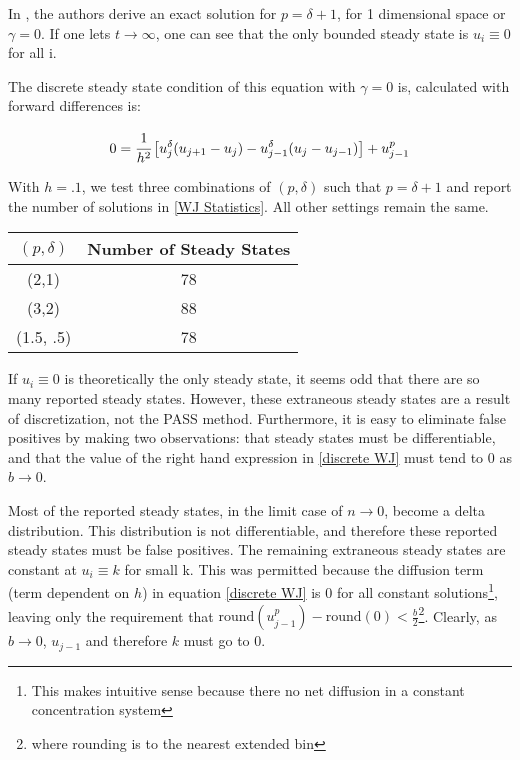 \documentclass[11pt]{article}
\begin{document}
In \citep{WJ}, the authors derive an exact solution for $p = \delta + 1$, for 1 dimensional space or $\gamma = 0$. If one lets $t \rightarrow \infty$, one can see that the only bounded steady state is $u_i \equiv 0$ for all i.

The discrete steady state condition of this equation with $\gamma = 0$ is, calculated with forward differences is:

\begin{equation}
  \label{discrete WJ}
  0 = \cfrac{1}{h^2} \left[ u_{j}^\delta (u_{j+1} - u_{j}) - u_{j-1}^\delta (u_{j} - u_{j-1}) \right] + u_{j-1}^p
\end{equation}

With $h = .1$, we test three combinations of $(p, \delta)$ such that $p = \delta + 1$ and report the number of solutions in \cref{WJ Statistics}. All other settings remain the same.

\begin{table*}
\begin{center}
\label{WJ Statistics}
\begin{tabular}{ | c | c | }
\hline
$(p, \delta)$ & Number of Steady States \\
\hline
(2,1) & 78 \\
\hline
(3,2) & 88 \\ 
\hline
(1.5, .5) & 78 \\
\hline
\end{tabular}
\setcounter{table}{1}
\caption{$(p, \delta)$ vs. Number of numerical steady states given $h = .1$}
\end{center}
\end{table*}

If $u_i \equiv 0$ is theoretically the only steady state, it seems odd that there are so many reported steady states. However, these extraneous steady states are a result of discretization, not the PASS method. Furthermore, it is easy to eliminate false positives by making two observations: that steady states must be differentiable, and that the value of the right hand expression in \cref{discrete WJ} must tend to 0 as $b \rightarrow 0$. 

Most of the reported steady states, in the limit case of $n \rightarrow 0$, become a delta distribution. This distribution is not differentiable, and therefore these reported steady states must be false positives. The remaining extraneous steady states are constant at $u_i \equiv k$ for small k. This was permitted because the diffusion term (term dependent on $h$) in equation \cref{discrete WJ} is 0 for all constant solutions\footnote{This makes intuitive sense because there no net diffusion in a constant concentration system}, leaving only the requirement that $\text{round}(u_{j-1}^p) - \text{round}(0) < \frac{b}{2}$\footnote{where rounding is to the nearest extended bin}. Clearly, as $b \rightarrow 0$, $u_{j-1}$ and therefore $k$ must go to 0.
\end{document}
